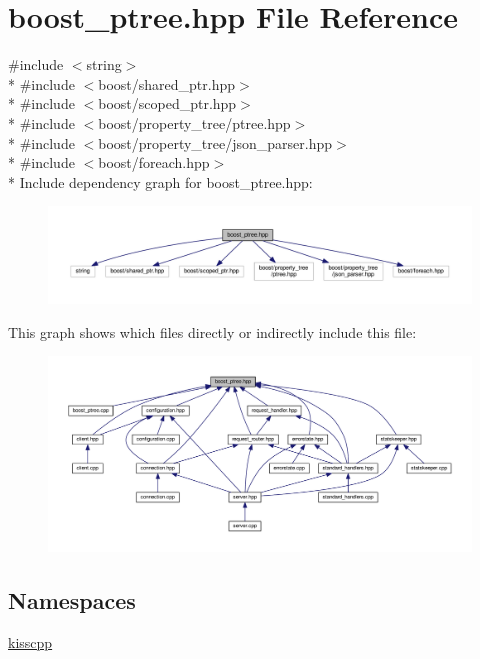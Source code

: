 \hypertarget{a00048}{\section{boost\-\_\-ptree.\-hpp File Reference}
\label{a00048}
}
{\ttfamily \#include $<$string$>$}\\*
{\ttfamily \#include $<$boost/shared\-\_\-ptr.\-hpp$>$}\\*
{\ttfamily \#include $<$boost/scoped\-\_\-ptr.\-hpp$>$}\\*
{\ttfamily \#include $<$boost/property\-\_\-tree/ptree.\-hpp$>$}\\*
{\ttfamily \#include $<$boost/property\-\_\-tree/json\-\_\-parser.\-hpp$>$}\\*
{\ttfamily \#include $<$boost/foreach.\-hpp$>$}\\*
Include dependency graph for boost\-\_\-ptree.\-hpp\-:\nopagebreak
\begin{figure}[H]
\begin{center}
\leavevmode
\includegraphics[width=350pt]{a00093}
\end{center}
\end{figure}
This graph shows which files directly or indirectly include this file\-:\nopagebreak
\begin{figure}[H]
\begin{center}
\leavevmode
\includegraphics[width=350pt]{a00094}
\end{center}
\end{figure}
\subsection*{Namespaces}
\begin{DoxyCompactItemize}
\item 
\hyperlink{a00089}{kisscpp}
\end{DoxyCompactItemize}
